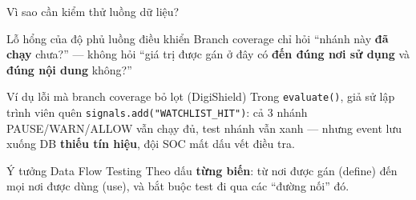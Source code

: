 \documentclass[aspectratio=169,12pt]{beamer}
\begin{document}
\begin{frame}{Vì sao cần kiểm thử luồng dữ liệu?}
  \begin{alertblock}{Lỗ hổng của độ phủ luồng điều khiển}
    Branch coverage chỉ hỏi ``nhánh này \textbf{đã chạy} chưa?'' ---
    không hỏi ``giá trị được gán ở đây có \textbf{đến đúng nơi
    sử dụng} và \textbf{đúng nội dung} không?''
  \end{alertblock}

  \vspace{0.3em}
  \begin{exampleblock}{Ví dụ lỗi mà branch coverage bỏ lọt (DigiShield)}
    Trong \texttt{evaluate()}, giả sử lập trình viên quên
    \texttt{signals.add("WATCHLIST\_HIT")}: cả 3 nhánh
    PAUSE/WARN/ALLOW vẫn chạy đủ, test nhánh vẫn xanh ---
    nhưng event lưu xuống DB \textbf{thiếu tín hiệu}, đội SOC
    mất dấu vết điều tra.
  \end{exampleblock}

  \begin{block}{Ý tưởng Data Flow Testing}
    Theo dấu \textbf{từng biến}: từ nơi được gán (define)
    đến mọi nơi được dùng (use), và bắt buộc test đi qua các
    ``đường nối'' đó.
  \end{block}
\end{frame}
\end{document}
